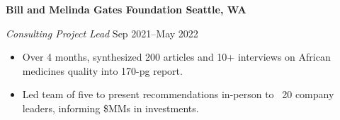 \textbf{Bill and Melinda Gates Foundation \hfill Seattle, WA}\par
\textit{Consulting Project Lead} \hfill Sep 2021--May 2022
\begin{itemize}
	\item Over 4 months, synthesized 200 articles and 10+ interviews on African medicines quality into 170-pg report.
	\item Led team of five to present recommendations in-person to ~20 company leaders, informing \$MMs in investments.
\end{itemize}\par